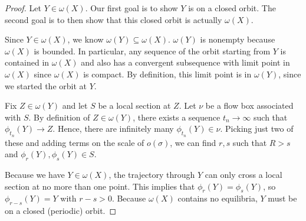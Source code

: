 \documentclass{tufte-handout}
\theoremstyle{definition}
\begin{document}
\begin{proof}
	Let $Y \in \omega(X)$. Our first goal is to show $Y$ is on a closed orbit. The second goal is to then show that this closed orbit is actually $\omega(X)$.

	Since $Y \in \omega(X)$, we know $\omega(Y) \subseteq \omega(X)$. $\omega(Y)$ is nonempty because $\omega(X)$ is bounded. In particular, any sequence of the orbit starting from $Y$ is contained in $\omega(X)$ and also has a convergent subsequence with limit point in $\omega(X)$ since $\omega(X)$ is compact. By definition, this limit point is in $\omega(Y)$, since we started the orbit at $Y$.

	Fix $Z \in \omega(Y)$ and let $S$ be a local section at $Z$. Let $\nu$ be a flow box associated with $S$. By definition of $Z \in \omega(Y)$, there exists a sequence $t_n \to \infty$ such that $\phi_{t_n} \left( Y \right) \to Z$. Hence, there are infinitely many $\phi_{t_n}(Y) \in \nu$. Picking just two of these and adding terms on the scale of $o(\sigma)$, we can find $r,s$ such that $R > s$ and $\phi_r(Y), \phi_s(Y) \in S$.

	Because we have $Y \in \omega(X)$, the trajectory through $Y$ can only cross a local section at no more than one point. This implies that $\phi_r(Y) = \phi_s(Y)$, so $\phi_{r-s}(Y) = Y$ with $r - s > 0$. Because $\omega(X)$ contains no equilibria, $Y$ must be on a closed (periodic) orbit.
\end{proof}
\end{document}
